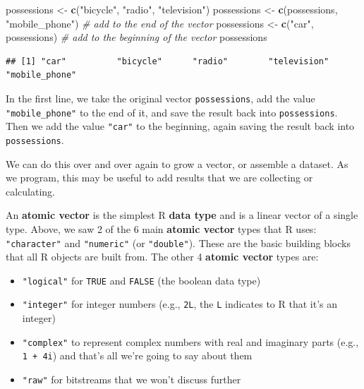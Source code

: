 \documentclass[]{book}
\newenvironment{Shaded}{\begin{snugshade}}{\end{snugshade}}
\newcommand{\KeywordTok}[1]{\textcolor[rgb]{0.13,0.29,0.53}{\textbf{#1}}}
\newcommand{\StringTok}[1]{\textcolor[rgb]{0.31,0.60,0.02}{#1}}
\newcommand{\CommentTok}[1]{\textcolor[rgb]{0.56,0.35,0.01}{\textit{#1}}}
\newcommand{\NormalTok}[1]{#1}
\providecommand{\tightlist}{%
  \setlength{\itemsep}{0pt}\setlength{\parskip}{0pt}}
\begin{document}
\begin{Shaded}
\begin{Highlighting}[]
\NormalTok{possessions <-}\StringTok{ }\KeywordTok{c}\NormalTok{(}\StringTok{"bicycle"}\NormalTok{, }\StringTok{"radio"}\NormalTok{, }\StringTok{"television"}\NormalTok{)}
\NormalTok{possessions <-}\StringTok{ }\KeywordTok{c}\NormalTok{(possessions, }\StringTok{"mobile_phone"}\NormalTok{) }\CommentTok{# add to the end of the vector}
\NormalTok{possessions <-}\StringTok{ }\KeywordTok{c}\NormalTok{(}\StringTok{"car"}\NormalTok{, possessions) }\CommentTok{# add to the beginning of the vector}
\NormalTok{possessions}
\end{Highlighting}
\end{Shaded}

\begin{verbatim}
## [1] "car"          "bicycle"      "radio"        "television"   "mobile_phone"
\end{verbatim}

In the first line, we take the original vector \texttt{possessions}, add
the value \texttt{"mobile\_phone"} to the end of it, and save the result
back into \texttt{possessions}. Then we add the value \texttt{"car"} to
the beginning, again saving the result back into \texttt{possessions}.

We can do this over and over again to grow a vector, or assemble a
dataset. As we program, this may be useful to add results that we are
collecting or calculating.

An \textbf{atomic vector} is the simplest R \textbf{data type} and is a
linear vector of a single type. Above, we saw 2 of the 6 main
\textbf{atomic vector} types that R uses: \texttt{"character"} and
\texttt{"numeric"} (or \texttt{"double"}). These are the basic building
blocks that all R objects are built from. The other 4 \textbf{atomic
vector} types are:

\begin{itemize}
\tightlist
\item
  \texttt{"logical"} for \texttt{TRUE} and \texttt{FALSE} (the boolean
  data type)
\item
  \texttt{"integer"} for integer numbers (e.g., \texttt{2L}, the
  \texttt{L} indicates to R that it's an integer)
\item
  \texttt{"complex"} to represent complex numbers with real and
  imaginary parts (e.g., \texttt{1\ +\ 4i}) and that's all we're going
  to say about them
\item
  \texttt{"raw"} for bitstreams that we won't discuss further
\end{itemize}
\end{document}
